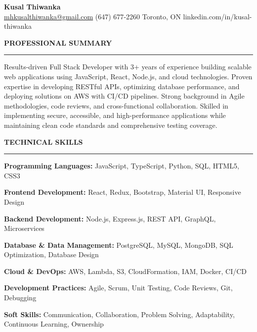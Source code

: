 \documentclass[10pt,letterpaper]{article}
\begin{document}
\begin{center}
{\LARGE\textbf{Kusal Thiwanka}}\\[3pt]
\href{mailto:mhkusalthiwanka@gmail.com}{mhkusalthiwanka@gmail.com}\hspace{2em}%
(647) 677{-}2260\hspace{2em}%
Toronto, ON\hspace{2em}
linkedin.com/in/kusal-thiwanka
\end{center}

\vspace{6pt}

\textbf{PROFESSIONAL SUMMARY}\\[-8pt]
\noindent\rule{\textwidth}{1pt}

\vspace{-2pt}

Results-driven Full Stack Developer with 3+ years of experience building scalable web applications using JavaScript, React, Node.js, and cloud technologies. Proven expertise in developing RESTful APIs, optimizing database performance, and deploying solutions on AWS with CI/CD pipelines. Strong background in Agile methodologies, code reviews, and cross-functional collaboration. Skilled in implementing secure, accessible, and high-performance applications while maintaining clean code standards and comprehensive testing coverage.

\vspace{8pt}

\textbf{TECHNICAL SKILLS}\\[-8pt]
\noindent\rule{\textwidth}{1pt}

\vspace{-2pt}

\textbf{Programming Languages:} JavaScript, TypeScript, Python, SQL, HTML5, CSS3

\textbf{Frontend Development:} React, Redux, Bootstrap, Material UI, Responsive Design

\textbf{Backend Development:} Node.js, Express.js, REST API, GraphQL, Microservices

\textbf{Database \& Data Management:} PostgreSQL, MySQL, MongoDB, SQL Optimization, Database Design

\textbf{Cloud \& DevOps:} AWS, Lambda, S3, CloudFormation, IAM, Docker, CI/CD

\textbf{Development Practices:} Agile, Scrum, Unit Testing, Code Reviews, Git, Debugging

\textbf{Soft Skills:} Communication, Collaboration, Problem Solving, Adaptability, Continuous Learning, Ownership
\end{document}
